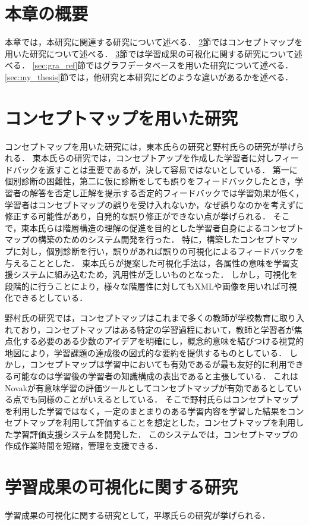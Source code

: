\section{本章の概要}
本章では，本研究に関連する研究について述べる．
\ref{sec:concept_ref}節ではコンセプトマップを用いた研究について述べる．
\ref{sec:kasika_ref}節では学習成果の可視化に関する研究について述べる．
\ref{sec:gra_ref}節ではグラフデータベースを用いた研究について述べる．
\ref{sec:my_thesis}節では，他研究と本研究にどのような違いがあるかを述べる．

\section{コンセプトマップを用いた研究}\label{sec:concept_ref}
コンセプトマップを用いた研究には，東本氏らの研究\cite{toumoto}と野村氏らの研究\cite{nomura_manabu}が挙げられる．
東本氏らの研究では，コンセプトアップを作成した学習者に対しフィードバックを返すことは重要であるが，決して容易ではないとしている．
第一に個別診断の困難性，第二に仮に診断をしても誤りをフィードバックしたとき，学習者の解答を否定し正解を提示する否定的フィードバックでは学習効果が低く，学習者はコンセプトマップの誤りを受け入れないか，なぜ誤りなのかを考えずに修正する可能性があり，自発的な誤り修正ができない点が挙げられる．
そこで，東本氏らは階層構造の理解の促進を目的とした学習者自身によるコンセプトマップの構築のためのシステム開発を行った．
特に，構築したコンセプトマップに対し，個別診断を行い，誤りがあれば誤りの可視化によるフィードバックを与えることとした．
東本氏らが提案した可視化手法は，各属性の意味を学習支援システムに組み込むため，汎用性が乏しいものとなった．
しかし，可視化を段階的に行うことにより，様々な階層性に対してもXMLや画像を用いれば可視化できるとしている．

野村氏の研究では，コンセプトマップはこれまで多くの教師が学校教育に取り入れており，コンセプトマップはある特定の学習過程において，教師と学習者が焦点化する必要のある少数のアイデアを明確にし，概念的意味を結びつける視覚的地図により，学習課題の達成後の図式的な要約を提供するものとしている．
しかし，コンセプトマップは学習中においても有効であるが最も友好的に利用できる可能なのは学習後の学習者の知識構成の表出であると主張している．
これはNovak\cite{concept}\cite{novak}が有意味学習の評価ツールとしてコンセプトマップが有効であるとしている点でも同様のことがいえるとしている．
そこで野村氏らはコンセプトマップを利用した学習ではなく，一定のまとまりのある学習内容を学習した結果をコンセプトマップを利用して評価することを想定とした，コンセプトマップを利用した学習評価支援システムを開発した．
このシステムでは，コンセプトマップの作成作業時間を短縮，管理を支援できる．

\section{学習成果の可視化に関する研究}\label{sec:kasika_ref}
学習成果の可視化に関する研究として，平塚氏らの研究が挙げられる．